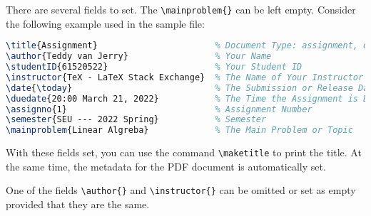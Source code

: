 \documentclass[oneside]{seu-ml-assign}
\begin{document}


      There are several fields to set.
      The \verb|\mainproblem{}| can be left empty.
      Consider the following example used in the sample file:
      \begin{lstlisting}[language=tex,numbers=none]
\title{Assignment}                       % Document Type: assignment, quiz, etc.
\author{Teddy van Jerry}                 % Your Name
\studentID{61520522}                     % Your Student ID
\instructor{TeX - LaTeX Stack Exchange}  % The Name of Your Instructor
\date{\today}                            % The Submission or Release Date
\duedate{20:00 March 21, 2022}           % The Time the Assignment is Due
\assignno{1}                             % Assignment Number
\semester{SEU --- 2022 Spring}           % Semester
\mainproblem{Linear Algreba}             % The Main Problem or Topic
      \end{lstlisting}
    
      With these fields set, you can use the command \verb|\maketitle| to print the title.
      At the same time, the metadata for the PDF document is automatically set.

    \label{subsec:prob_only_properties}
    One of the fields \verb|\author{}| and \verb|\instructor{}| can be omitted or set as empty provided that they are the same.


    \label{subsec:section_normal_title}
\end{document}
